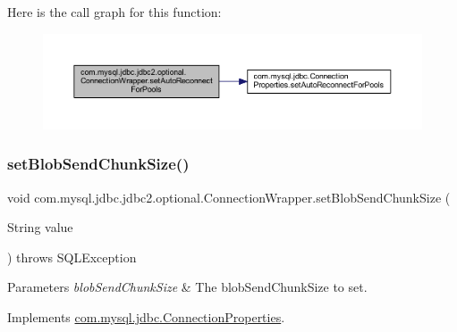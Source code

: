 Here is the call graph for this function\+:
\nopagebreak
\begin{figure}[H]
\begin{center}
\leavevmode
\includegraphics[width=350pt]{classcom_1_1mysql_1_1jdbc_1_1jdbc2_1_1optional_1_1_connection_wrapper_ae86cd6b7f7098459fecb312efd62181d_cgraph}
\end{center}
\end{figure}
\mbox{\label{classcom_1_1mysql_1_1jdbc_1_1jdbc2_1_1optional_1_1_connection_wrapper_ad2a5eec9a52c3c5a68de2bc6af8f333e}} 
\subsubsection{\texorpdfstring{set\+Blob\+Send\+Chunk\+Size()}{setBlobSendChunkSize()}}
{\footnotesize\ttfamily void com.\+mysql.\+jdbc.\+jdbc2.\+optional.\+Connection\+Wrapper.\+set\+Blob\+Send\+Chunk\+Size (\begin{DoxyParamCaption}\item[{String}]{value }\end{DoxyParamCaption}) throws S\+Q\+L\+Exception}


\begin{DoxyParams}{Parameters}
{\em blob\+Send\+Chunk\+Size} & The blob\+Send\+Chunk\+Size to set. \\
\hline
\end{DoxyParams}


Implements \mbox{\hyperlink{interfacecom_1_1mysql_1_1jdbc_1_1_connection_properties_ab16063397e021c5f18662127d274d4d5}{com.\+mysql.\+jdbc.\+Connection\+Properties}}.

